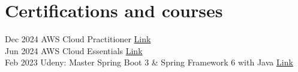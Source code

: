 \documentclass[letterpaper]{twentysecondcv} %
\begin{document}
\vspace{6mm}

\section{Certifications and courses}
\begin{twenty} %
	\twentyitem
    		{Dec 2024}
		{}
        		{AWS Cloud Practitioner}
        		{\href{https://www.credly.com/badges/5ec185ac-c564-4941-b258-3169c7152ae7}{Link}}
        		{}
        		{}\\
	\twentyitem
    		{Jun 2024}
		{}
        		{AWS Cloud Essentials}
        		{\href{https://link.springer.com/chapter/10.1007/978-3-662-54577-5_27}{Link}}
        		{}
        		{}\\
        	\twentyitem
    		{Feb 2023}
		{}
        		{Udeny: Master Spring Boot 3 \& Spring Framework 6 with Java}
        		{\href{https://www.udemy.com/certificate/UC-1aac444c-0cd8-485f-8480-8e6c3bfbb18a/}{Link}}
        		{}
        		{}
\end{twenty}

\vspace{6mm}

\end{document}
